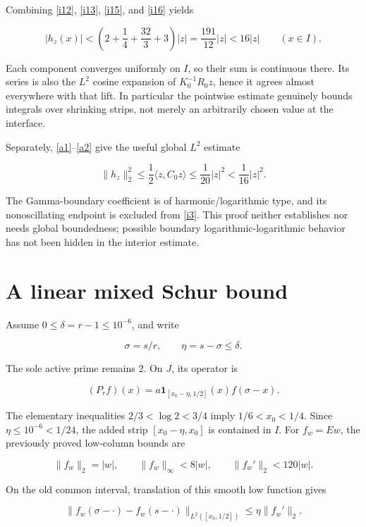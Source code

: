 \documentclass[11pt]{article}
\begin{document}
Combining \eqref{i12}, \eqref{i13}, \eqref{i15}, and \eqref{i16} yields

\[
 |h_z(x)|<\left(2+\frac14+\frac{32}3+3\right)|z|
 =\frac{191}{12}|z|<16|z|\qquad(x\in I).
\]

Each component converges uniformly on \(I\), so their sum is continuous there. Its series is also the \(L^2\) cosine expansion of \(K_0^{-1}R_0z\), hence it agrees almost everywhere with that lift. In particular the pointwise estimate genuinely bounds integrals over shrinking strips, not merely an arbitrarily chosen value at the interface.

Separately, \eqref{a1}--\eqref{a2} give the useful global \(L^2\) estimate

\begin{equation}\label{i17}
\|h_z\|_2^2\le\frac12\langle z,C_0z\rangle
 \le\frac1{20}|z|^2<\frac1{16}|z|^2.
\end{equation}

The Gamma-boundary coefficient is of harmonic/logarithmic type, and its nonoscillating endpoint is excluded from \eqref{i3}. This proof neither establishes nor needs global boundedness; possible boundary logarithmic-logarithmic behavior has not been hidden in the interior estimate.

\section{A linear mixed Schur bound}

Assume \(0\le\delta=r-1\le10^{-6}\), and write

\[
 \sigma=s/r,\qquad\eta=s-\sigma\le\delta.
\]

The sole active prime remains 2. On \(J\), its operator is

\[
 (P_rf)(x)=a\mathbf1_{[x_0-\eta,1/2]}(x)f(\sigma-x).
\]

The elementary inequalities \(2/3<\log2<3/4\) imply \(1/6<x_0<1/4\). Since \(\eta\le10^{-6}<1/24\), the added strip \([x_0-\eta,x_0]\) is contained in \(I\). For \(f_w=Ew\), the previously proved low-column bounds are

\begin{equation}\label{i18}
\|f_w\|_2=|w|,\qquad\|f_w\|_\infty<8|w|,
 \qquad\|f_w'\|_2<120|w|.
\end{equation}

On the old common interval, translation of this smooth low function gives

\[
 \|f_w(\sigma-\cdot)-f_w(s-\cdot)\|_{L^2([x_0,1/2])}
 \le\eta\|f_w'\|_2.
\]
\end{document}
